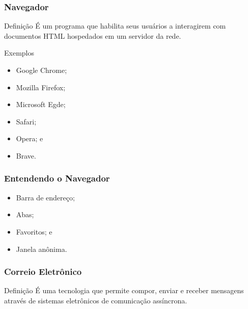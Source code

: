 \documentclass[aspectratio=169]{beamer} %
\begin{document}
\begin{frame}
	\frametitle{Navegador}
	
	\begin{block}{Defini\c cão}
		É um programa que habilita seus usuários a interagirem com documentos HTML hospedados em um servidor da rede.
	\end{block} \vfill
	
	\begin{exampleblock}{Exemplos}
		\begin{itemize}
			\item Google Chrome;
			\item Mozilla Firefox;
			\item Microsoft Egde;
			\item Safari;
			\item Opera; e
			\item Brave.
		\end{itemize}
	\end{exampleblock}
\end{frame}

\begin{frame}
	\frametitle{Entendendo o Navegador}
	
	\begin{itemize}
		\item Barra de endereço;
		\item Abas;
		\item Favoritos; e
		\item Janela anônima.
	\end{itemize}
\end{frame}

\begin{frame}
	\frametitle{Correio Eletrônico}
	
	\begin{block}{Defini\c cão}
		É uma tecnologia que permite compor, enviar e receber mensagens através de sistemas eletrônicos de comunicação assíncrona.
	\end{block}
\end{frame}
\end{document}
